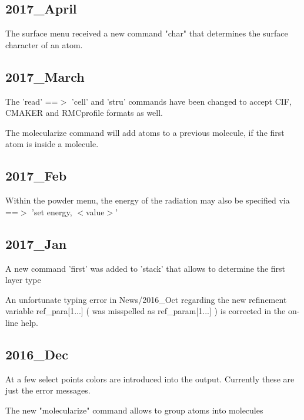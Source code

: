 \subsection*{2017\_April}
\par
The surface menu received a new command "char" that determines 
the surface character of an atom. 
\subsection*{2017\_March}
\par
The 'read' ==$> $ 'cell' and 'stru' commands have been changed to 
accept CIF, CMAKER and RMCprofile formats as well. 
\par
The molecularize command will add atoms to a previous molecule, if 
the first atom is inside a molecule. 
\subsection*{2017\_Feb}
\par
Within the powder menu, the energy of the radiation may also 
be specified via ==$> $ 'set energy, $ <$value$> $' 
\subsection*{2017\_Jan}
\par
A new command 'first' was added to 'stack' that allows to determine 
the first layer type 
\par
An unfortunate typing error in News/2016\_Oct regarding the new 
refinement variable 
ref\_para[1...]   ( was misspelled as ref\_param[1...] ) 
is corrected in the  on-line help. 
\subsection*{2016\_Dec}
\par
At a few select points colors are introduced into the output. 
Currently these are just the error messages. 
\par
The new "molecularize" command allows to group atoms into molecules 

